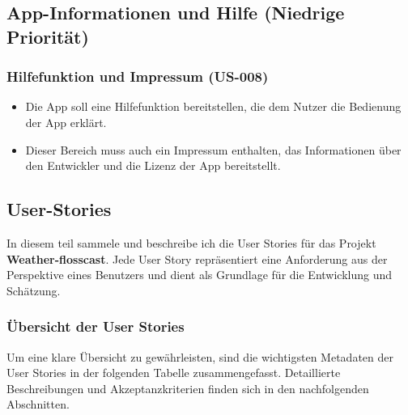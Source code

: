 \documentclass{article}
\begin{document}
\subsection{App-Informationen und Hilfe (Niedrige Priorität)}

\subsubsection{Hilfefunktion und Impressum (US-008)}
\begin{itemize}
    \item Die App soll eine Hilfefunktion bereitstellen, die dem Nutzer die Bedienung der App erklärt.
    \item Dieser Bereich muss auch ein Impressum enthalten, das Informationen über den Entwickler und die Lizenz der App bereitstellt.
\end{itemize}

\subsection{User-Stories}
In diesem teil sammele und beschreibe ich die User Stories für das Projekt \textbf{Weather-flosscast}. Jede User Story repräsentiert eine Anforderung aus der Perspektive eines Benutzers und dient als Grundlage für die Entwicklung und Schätzung.

\subsubsection{Übersicht der User Stories}
Um eine klare Übersicht zu gewährleisten, sind die wichtigsten Metadaten der User Stories in der folgenden Tabelle zusammengefasst. Detaillierte Beschreibungen und Akzeptanzkriterien finden sich in den nachfolgenden Abschnitten.
\end{document}
